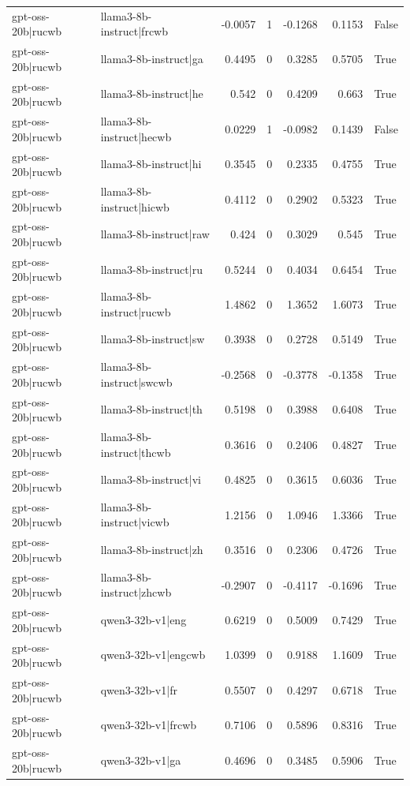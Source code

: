 \begin{table}
\begin{tabular}{l l r r r r l}
gpt-oss-20b|rucwb & llama3-8b-instruct|frcwb & -0.0057 & 1 & -0.1268 & 0.1153 & False \\
gpt-oss-20b|rucwb & llama3-8b-instruct|ga & 0.4495 & 0 & 0.3285 & 0.5705 & True \\
gpt-oss-20b|rucwb & llama3-8b-instruct|he & 0.542 & 0 & 0.4209 & 0.663 & True \\
gpt-oss-20b|rucwb & llama3-8b-instruct|hecwb & 0.0229 & 1 & -0.0982 & 0.1439 & False \\
gpt-oss-20b|rucwb & llama3-8b-instruct|hi & 0.3545 & 0 & 0.2335 & 0.4755 & True \\
gpt-oss-20b|rucwb & llama3-8b-instruct|hicwb & 0.4112 & 0 & 0.2902 & 0.5323 & True \\
gpt-oss-20b|rucwb & llama3-8b-instruct|raw & 0.424 & 0 & 0.3029 & 0.545 & True \\
gpt-oss-20b|rucwb & llama3-8b-instruct|ru & 0.5244 & 0 & 0.4034 & 0.6454 & True \\
gpt-oss-20b|rucwb & llama3-8b-instruct|rucwb & 1.4862 & 0 & 1.3652 & 1.6073 & True \\
gpt-oss-20b|rucwb & llama3-8b-instruct|sw & 0.3938 & 0 & 0.2728 & 0.5149 & True \\
gpt-oss-20b|rucwb & llama3-8b-instruct|swcwb & -0.2568 & 0 & -0.3778 & -0.1358 & True \\
gpt-oss-20b|rucwb & llama3-8b-instruct|th & 0.5198 & 0 & 0.3988 & 0.6408 & True \\
gpt-oss-20b|rucwb & llama3-8b-instruct|thcwb & 0.3616 & 0 & 0.2406 & 0.4827 & True \\
gpt-oss-20b|rucwb & llama3-8b-instruct|vi & 0.4825 & 0 & 0.3615 & 0.6036 & True \\
gpt-oss-20b|rucwb & llama3-8b-instruct|vicwb & 1.2156 & 0 & 1.0946 & 1.3366 & True \\
gpt-oss-20b|rucwb & llama3-8b-instruct|zh & 0.3516 & 0 & 0.2306 & 0.4726 & True \\
gpt-oss-20b|rucwb & llama3-8b-instruct|zhcwb & -0.2907 & 0 & -0.4117 & -0.1696 & True \\
gpt-oss-20b|rucwb & qwen3-32b-v1|eng & 0.6219 & 0 & 0.5009 & 0.7429 & True \\
gpt-oss-20b|rucwb & qwen3-32b-v1|engcwb & 1.0399 & 0 & 0.9188 & 1.1609 & True \\
gpt-oss-20b|rucwb & qwen3-32b-v1|fr & 0.5507 & 0 & 0.4297 & 0.6718 & True \\
gpt-oss-20b|rucwb & qwen3-32b-v1|frcwb & 0.7106 & 0 & 0.5896 & 0.8316 & True \\
gpt-oss-20b|rucwb & qwen3-32b-v1|ga & 0.4696 & 0 & 0.3485 & 0.5906 & True \\

\end{tabular}
\end{table}

